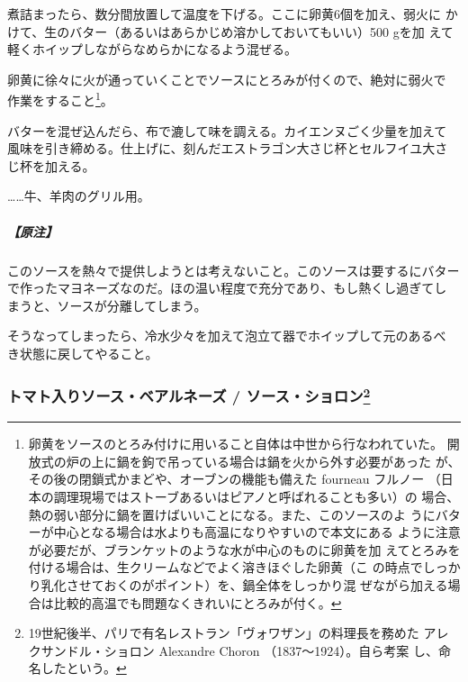 \begin{recette}
煮詰まったら、数分間放置して温度を下げる。ここに卵黄6個を加え、弱火に
かけて、生のバター（あるいはあらかじめ溶かしておいてもいい）500 gを加
えて軽くホイップしながらなめらかになるよう混ぜる。

卵黄に徐々に火が通っていくことでソースにとろみが付くので、絶対に弱火で
作業をすること\footnote{卵黄をソースのとろみ付けに用いること自体は中世から行なわれていた。
  開放式の炉の上に鍋を鉤で吊っている場合は鍋を火から外す必要があった
  が、その後の閉鎖式かまどや、オーブンの機能も備えた fourneau フルノー
  （日本の調理現場ではストーブあるいはピアノと呼ばれることも多い）の
  場合、熱の弱い部分に鍋を置けばいいことになる。また、このソースのよ
  うにバターが中心となる場合は水よりも高温になりやすいので本文にある
  ように注意が必要だが、ブランケットのような水が中心のものに卵黄を加
  えてとろみを付ける場合は、生クリームなどでよく溶きほぐした卵黄（こ
  の時点でしっかり乳化させておくのがポイント）を、鍋全体をしっかり混
  ぜながら加える場合は比較的高温でも問題なくきれいにとろみが付く。}。

バターを混ぜ込んだら、布で漉して味を調える。カイエンヌごく少量を加えて
風味を引き締める。仕上げに、刻んだエストラゴン大さじ杯とセルフイユ大さ
じ\undemi{}杯を加える。

\ldots{}\ldots{}牛、羊肉のグリル用。

\hypertarget{ux539fux6ce8}{%
\subparagraph{【原注】}\label{ux539fux6ce8}}

このソースを熱々で提供しようとは考えないこと。このソースは要するにバター
で作ったマヨネーズなのだ。ほの温い程度で充分であり、もし熱くし過ぎてし
まうと、ソースが分離してしまう。

そうなってしまったら、冷水少々を加えて泡立て器でホイップして元のあるべ
き状態に戻してやること。

\maeaki

\hypertarget{ux30c8ux30deux30c8ux5165ux308aux30bdux30fcux30b9ux30d9ux30a2ux30ebux30cdux30fcux30ba-ux30bdux30fcux30b9ux30b7ux30e7ux30edux30f310}{%
\subsubsection[トマト入りソース・ベアルネーズ /
ソース・ショロン]{\texorpdfstring{トマト入りソース・ベアルネーズ /
ソース・ショロン\footnote{19世紀後半、パリで有名レストラン「ヴォワザン」の料理長を務めた
  アレクサンドル・ショロン Alexandre Choron （1837〜1924）。自ら考案
  し、命名したという。}}{トマト入りソース・ベアルネーズ / ソース・ショロン}}\label{ux30c8ux30deux30c8ux5165ux308aux30bdux30fcux30b9ux30d9ux30a2ux30ebux30cdux30fcux30ba-ux30bdux30fcux30b9ux30b7ux30e7ux30edux30f310}}


\end{recette}
